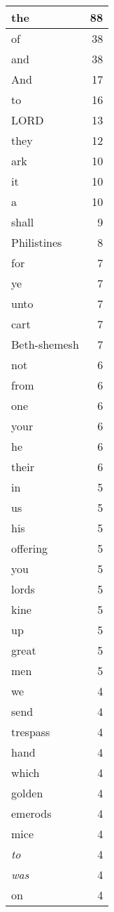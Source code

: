 \begin{center}
\begin{longtable}{l|r}
\hline \hline
\endlastfoot
the & 88 \\ \hline
of & 38 \\ \hline
and & 38 \\ \hline
And & 17 \\ \hline
to & 16 \\ \hline
LORD & 13 \\ \hline
they & 12 \\ \hline
ark & 10 \\ \hline
it & 10 \\ \hline
a & 10 \\ \hline
shall & 9 \\ \hline
Philistines & 8 \\ \hline
for & 7 \\ \hline
ye & 7 \\ \hline
unto & 7 \\ \hline
cart & 7 \\ \hline
Beth-shemesh & 7 \\ \hline
not & 6 \\ \hline
from & 6 \\ \hline
one & 6 \\ \hline
your & 6 \\ \hline
he & 6 \\ \hline
their & 6 \\ \hline
in & 5 \\ \hline
us & 5 \\ \hline
his & 5 \\ \hline
offering & 5 \\ \hline
you & 5 \\ \hline
lords & 5 \\ \hline
kine & 5 \\ \hline
up & 5 \\ \hline
great & 5 \\ \hline
men & 5 \\ \hline
we & 4 \\ \hline
send & 4 \\ \hline
trespass & 4 \\ \hline
hand & 4 \\ \hline
which & 4 \\ \hline
golden & 4 \\ \hline
emerods & 4 \\ \hline
mice & 4 \\ \hline
\emph{to} & 4 \\ \hline
\emph{was} & 4 \\ \hline
on & 4 \\ \hline

\end{longtable}
\end{center}
